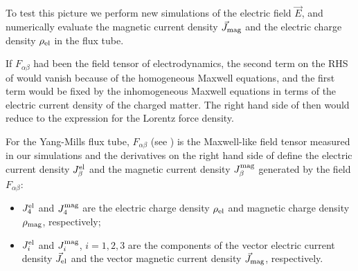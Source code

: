 \documentclass[pdftex,twocolumn,epjc3,envcountsect]{svjour3}
\begin{document}
To test this picture we perform new simulations of the electric field $\vec{E}$, and numerically evaluate the magnetic current density $\vec{J}_{\rm mag}$ and the electric charge density $\rho_{\rm el}$ in the flux tube.

If $F_{\alpha \beta}$ had been the field tensor of electrodynamics, the second term on the RHS of  would vanish because of the homogeneous Maxwell equations, and the first term would be fixed by the inhomogeneous Maxwell equations in terms of the electric current density of the charged matter. The right hand side of  then would reduce to the expression for the Lorentz force density.

For the Yang-Mills flux tube, $F_{\alpha \beta}$ (see ) is the Maxwell-like field tensor measured in our simulations and the derivatives on the right hand side of  define  the  electric current density $J_\beta^{\rm el}$ and the magnetic  current density $J_\beta^{\rm mag}$ generated by the field $F_{\alpha \beta}$:
\begin{itemize}
    \item[$\bullet$] $J^{\rm el}_4$ and $J^{\rm mag}_4$ are the electric charge density $\rho_{\rm el}$ and magnetic charge density $\rho_{\rm mag}$, respectively;
    \item[$\bullet$] $J^{\rm el}_i$ and $J^{\rm mag}_i$, $i = 1,2,3$ are the  components of the vector electric current density $\vec{J}_{\rm el}$ and the vector magnetic current density $\vec{J}_{\rm mag}$, respectively.
\end{itemize}
\end{document}
